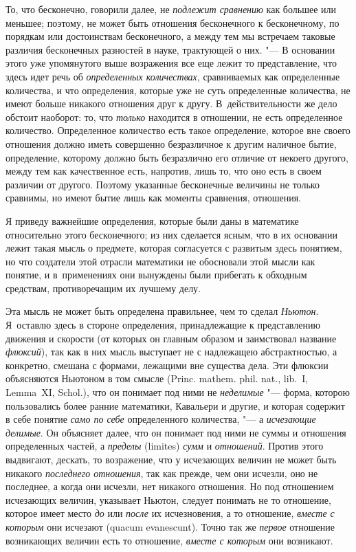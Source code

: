 То, что бесконечно, говорили далее, не {\em подлежит сравнению} как большее или
меньшее; поэтому, не может быть отношения бесконечного к бесконечному, по
порядкам или достоинствам бесконечного, а между тем мы встречаем таковые
различия бесконечных разностей в науке, трактующей о них. "--- В основании
этого уже упомянутого выше возражения все еще лежит то представление, что здесь
идет речь об {\em определенных количествах}, сравниваемых как определенные
количества, и что определения, которые уже не суть определенные количества, не
имеют больше никакого отношения друг к другу. В~действительности же дело
обстоит наоборот: то, что {\em только} находится в отношении, не есть
определенное количество. Определенное количество есть такое определение,
которое вне своего отношения должно иметь совершенно безразличное к другим
наличное бытие, определение, которому должно быть безразлично его отличие от
некоего другого, между тем как качественное есть, напротив, лишь то, что оно
есть в своем различии от другого. Поэтому указанные бесконечные величины не
только сравнимы, но имеют бытие лишь как моменты сравнения, отношения.

Я приведу важнейшие определения, которые были даны в математике относительно
этого бесконечного; из них сделается ясным, что в их основании лежит такая
мысль о предмете, которая согласуется с развитым здесь понятием, но что
создатели этой отрасли математики не обосновали этой мысли как понятие, и
в~применениях они вынуждены были прибегать к обходным средствам,
противоречащим их лучшему делу.

Эта мысль не может быть определена правильнее, чем то сделал {\em Ньютон}.
Я~оставлю здесь в стороне определения, принадлежащие к представлению движения и
скорости (от которых он главным образом и заимствовал название {\em флюксий}),
так как в них мысль выступает не с надлежащею абстрактностью, а конкретно,
смешана с формами, лежащими вне существа дела. Эти флюксии объясняются Ньютоном
в том смысле (Princ. mathem. phil. nat., lib.~I, Lemma~XI, Schol.), что он
понимает под ними не {\em неделимые} "--- форма, которою пользовались более
ранние математики, Кавальери и другие, и которая содержит в себе понятие
{\em само по себе} определенного количества, "--- а {\em исчезающие делимые}.
Он объясняет далее, что он понимает под ними не суммы и отношения определенных
частей, а {\em пределы} (limites) {\em сумм} и {\em отношений}. Против этого
выдвигают, дескать, то возражение, что у исчезающих величин не может быть
никакого {\em последнего отношения}, так как прежде, чем они исчезли, оно не
последнее, а когда они исчезли, нет никакого отношения. Но под отношением
исчезающих величин, указывает Ньютон, следует понимать не то отношение, которое
имеет место {\em до} или {\em после} их исчезновения, а то отношение,
{\em вместе с которым} они исчезают (quacum evanescunt). Точно так же
{\em первое} отношение возникающих величин есть то отношение,
{\em вместе с которым} они возникают.

